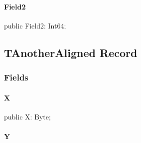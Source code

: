 \documentclass{report}
\begin{document}
\paragraph*{Field2}\hspace*{\fill}

\begin{list}{}{
\setlength{\itemindent}{0cm}
\setlength{\listparindent}{0cm}
\setlength{\leftmargin}{\evensidemargin}
\addtolength{\leftmargin}{\tmplength}
\settowidth{\labelsep}{X}
\addtolength{\leftmargin}{\labelsep}
\setlength{\labelwidth}{\tmplength}
}
\begin{flushleft}
\item[\textbf{Declaration}\hfill]
\begin{ttfamily}
public Field2: Int64;\end{ttfamily}


\end{flushleft}
\end{list}
\subsection*{TAnotherAligned Record}
\subsubsection*{\large{\textbf{Fields}}\normalsize\hspace{1ex}\hfill}
\paragraph*{X}\hspace*{\fill}

\begin{list}{}{
\setlength{\itemindent}{0cm}
\setlength{\listparindent}{0cm}
\setlength{\leftmargin}{\evensidemargin}
\addtolength{\leftmargin}{\tmplength}
\settowidth{\labelsep}{X}
\addtolength{\leftmargin}{\labelsep}
\setlength{\labelwidth}{\tmplength}
}
\begin{flushleft}
\item[\textbf{Declaration}\hfill]
\begin{ttfamily}
public X: Byte;\end{ttfamily}


\end{flushleft}
\end{list}
\paragraph*{Y}\hspace*{\fill}
\end{document}
